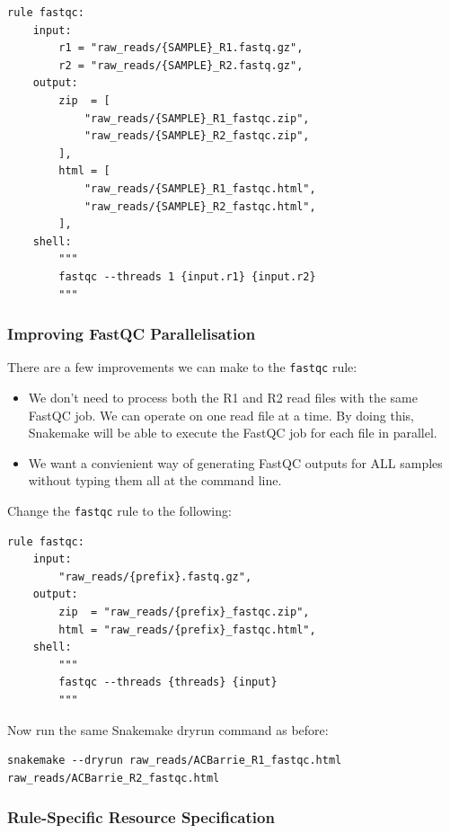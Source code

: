 \begin{lstlisting}
rule fastqc:
	input:
		r1 = "raw_reads/{SAMPLE}_R1.fastq.gz",
		r2 = "raw_reads/{SAMPLE}_R2.fastq.gz",
	output:
		zip  = [
			"raw_reads/{SAMPLE}_R1_fastqc.zip",
			"raw_reads/{SAMPLE}_R2_fastqc.zip",
		],
		html = [
			"raw_reads/{SAMPLE}_R1_fastqc.html",
			"raw_reads/{SAMPLE}_R2_fastqc.html",
		],
	shell:
		"""
		fastqc --threads 1 {input.r1} {input.r2}
		"""
\end{lstlisting}

\subsubsection{Improving FastQC Parallelisation}

There are a few improvements we can make to the \texttt{fastqc} rule:

\begin{itemize}
  \item We don't need to process both the R1 and R2 read files with the same FastQC job. We can operate on one read file at a time.
        By doing this, Snakemake will be able to execute the FastQC job for each file in parallel.
  \item We want a convienient way of generating FastQC outputs for ALL samples without typing them all at the command line.
\end{itemize}

Change the \texttt{fastqc} rule to the following:

\begin{lstlisting}
rule fastqc:
	input:
		"raw_reads/{prefix}.fastq.gz",
	output:
		zip  = "raw_reads/{prefix}_fastqc.zip",
		html = "raw_reads/{prefix}_fastqc.html",
	shell:
		"""
		fastqc --threads {threads} {input}
		"""
\end{lstlisting}

Now run the same Snakemake dryrun command as before:

\begin{lstlisting}
snakemake --dryrun raw_reads/ACBarrie_R1_fastqc.html raw_reads/ACBarrie_R2_fastqc.html
\end{lstlisting}

\subsubsection{Rule-Specific Resource Specification}

